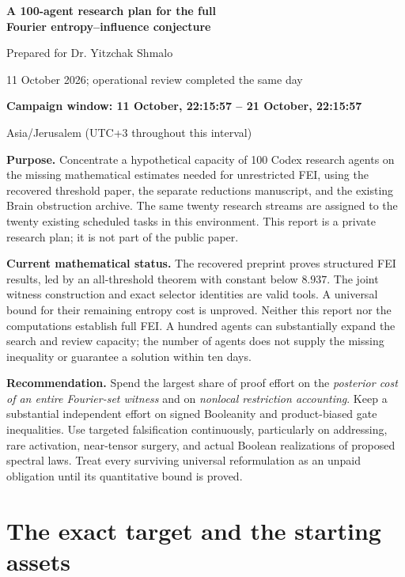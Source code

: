 \documentclass[11pt]{article}
\begin{document}
\begin{center}
{\Large\bfseries\color{ink} A 100-agent research plan for the full\\[3pt] Fourier entropy--influence conjecture}\par
\vspace{8pt}
{\large Prepared for Dr. Yitzchak Shmalo}\par
\vspace{4pt}
11 October 2026; operational review completed the same day\par
\textbf{Campaign window: 11 October, 22:15:57 -- 21 October, 22:15:57}\par
Asia/Jerusalem (UTC+3 throughout this interval)
\end{center}
\vspace{6pt}
\textbf{Purpose.} Concentrate a hypothetical capacity of 100 Codex research agents on the missing mathematical estimates needed for unrestricted FEI, using the recovered threshold paper, the separate reductions manuscript, and the existing Brain obstruction archive. The same twenty research streams are assigned to the twenty existing scheduled tasks in this environment. This report is a private research plan; it is not part of the public paper.

\textbf{Current mathematical status.} The recovered preprint proves structured FEI results, led by an all-threshold theorem with constant below $8.937$. The joint witness construction and exact selector identities are valid tools. A universal bound for their remaining entropy cost is unproved. Neither this report nor the computations establish full FEI. A hundred agents can substantially expand the search and review capacity; the number of agents does not supply the missing inequality or guarantee a solution within ten days.

\textbf{Recommendation.} Spend the largest share of proof effort on the \emph{posterior cost of an entire Fourier-set witness} and on \emph{nonlocal restriction accounting}. Keep a substantial independent effort on signed Booleanity and product-biased gate inequalities. Use targeted falsification continuously, particularly on addressing, rare activation, near-tensor surgery, and actual Boolean realizations of proposed spectral laws. Treat every surviving universal reformulation as an unpaid obligation until its quantitative bound is proved.

\tableofcontents
\newpage
\section{The exact target and the starting assets}
\end{document}
